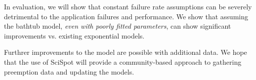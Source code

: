 In evaluation, we will show that constant failure rate assumptions can be severely detrimental to the application failures and performance.
We show that assuming the bathtub model, \emph{even with poorly fitted parameters}, can show significant improvements vs. existing exponential models.

Furthrer improvements to the model are possible with additional data.
We hope that the use of SciSpot will provide a community-based approach to gathering preemption data and updating the models.





